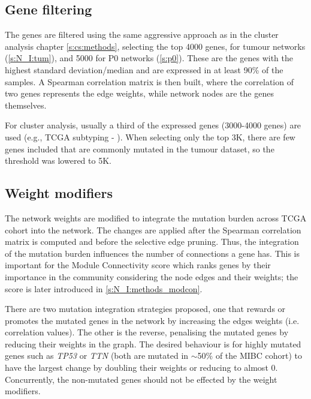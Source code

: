 \subsection{Gene filtering} \label{s:N_I:gene_filtering}

The genes are filtered using the same aggressive approach as in the cluster analysis chapter \cref{s:cs:methods}, selecting the top 4000 genes, for tumour networks (\cref{s:N_I:tum}), and 5000 for P0 networks (\cref{s:p0}). These are the genes with the highest standard deviation/median and are expressed in at least 90\% of the samples. A Spearman correlation matrix is then built, where the correlation of two genes represents the edge weights, while network nodes are the genes themselves. 

For cluster analysis, usually a third of the expressed genes (3000-4000 genes) are used (e.g., TCGA subtyping - \citet{Robertson2017-mg}). When selecting only the top 3K, there are few genes included that are commonly mutated in the tumour dataset, so the threshold was lowered to 5K.

\subsection{Weight modifiers} \label{s:N_I:weight_modifiers}

The network weights are modified to integrate the mutation burden across TCGA cohort into the network. The changes are applied after the Spearman correlation matrix is computed and before the selective edge pruning. Thus, the integration of the mutation burden influences the number of connections a gene has. This is important for the Module Connectivity score which ranks genes by their importance in the community considering the node edges and their weights; the score is later introduced in \cref{s:N_I:methods_modcon}.

There are two mutation integration strategies proposed, one that rewards or promotes the mutated genes in the network by increasing the edges weights (i.e. correlation values). The other is the reverse, penalising the mutated genes by reducing their weights in the graph. The desired behaviour is for highly mutated genes such as \textit{TP53} or \textit{TTN} (both are mutated in $\sim$50\% of the MIBC cohort) to have the largest change by doubling their weights or reducing to almost 0. Concurrently, the non-mutated genes should not be effected by the weight modifiers.

